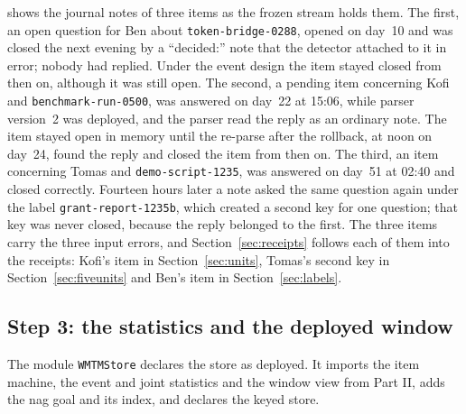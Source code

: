 \documentclass[11pt]{article}
\newcommand{\code}[1]{\texttt{#1}}
\theoremstyle{definition}
\theoremstyle{plain}
\begin{document}
 shows the journal notes of three items as the frozen stream holds them. The
first, an open question for Ben about \code{token-bridge-0288}, opened on day~10 and was closed the
next evening by a ``decided:'' note that the detector attached to it in error; nobody had replied.
Under the event design the item stayed closed from then on, although it was still open. The second,
a pending item concerning Kofi and \code{benchmark-run-0500}, was answered on day~22 at 15:06,
while parser version~2 was deployed, and the parser read the reply as an ordinary note. The item
stayed open in memory until the re-parse after the rollback, at noon on day~24, found the reply and
closed the item from then on. The third, an item concerning Tomas and \code{demo-script-1235}, was
answered on day~51 at 02:40 and closed correctly. Fourteen hours later a note asked the same
question again under the label \code{grant-report-1235b}, which created a second key for one
question; that key was never closed, because the reply belonged to the first. The three items carry
the three input errors, and Section~\ref{sec:receipts} follows each of them into the receipts: Kofi's
item in Section~\ref{sec:units}, Tomas's second key in Section~\ref{sec:fiveunits} and Ben's item in
Section~\ref{sec:labels}.

\subsection{Step 3: the statistics and the deployed window}\label{sec:statistics}

The module \code{WMTMStore} declares the store as deployed. It imports the item machine, the
event and joint statistics and the window view from Part II, adds the nag goal and its index, and
declares the keyed store.
\end{document}
